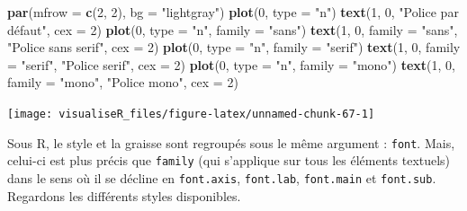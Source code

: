 \documentclass[]{article}
\newenvironment{Shaded}{\begin{snugshade}}{\end{snugshade}}
\newcommand{\DataTypeTok}[1]{\textcolor[rgb]{0.13,0.29,0.53}{#1}}
\newcommand{\DecValTok}[1]{\textcolor[rgb]{0.00,0.00,0.81}{#1}}
\newcommand{\KeywordTok}[1]{\textcolor[rgb]{0.13,0.29,0.53}{\textbf{#1}}}
\newcommand{\NormalTok}[1]{#1}
\newcommand{\StringTok}[1]{\textcolor[rgb]{0.31,0.60,0.02}{#1}}
\begin{document}
\begin{Shaded}
\begin{Highlighting}[]
\KeywordTok{par}\NormalTok{(}\DataTypeTok{mfrow =} \KeywordTok{c}\NormalTok{(}\DecValTok{2}\NormalTok{, }\DecValTok{2}\NormalTok{), }\DataTypeTok{bg =} \StringTok{"lightgray"}\NormalTok{)}
\KeywordTok{plot}\NormalTok{(}\DecValTok{0}\NormalTok{, }\DataTypeTok{type =} \StringTok{"n"}\NormalTok{)}
\KeywordTok{text}\NormalTok{(}\DecValTok{1}\NormalTok{, }\DecValTok{0}\NormalTok{, }\StringTok{"Police par défaut"}\NormalTok{, }\DataTypeTok{cex =} \DecValTok{2}\NormalTok{)}
\KeywordTok{plot}\NormalTok{(}\DecValTok{0}\NormalTok{, }\DataTypeTok{type =} \StringTok{"n"}\NormalTok{, }\DataTypeTok{family =} \StringTok{"sans"}\NormalTok{)}
\KeywordTok{text}\NormalTok{(}\DecValTok{1}\NormalTok{, }\DecValTok{0}\NormalTok{, }\DataTypeTok{family =} \StringTok{"sans"}\NormalTok{, }\StringTok{"Police sans serif"}\NormalTok{, }\DataTypeTok{cex =} \DecValTok{2}\NormalTok{)}
\KeywordTok{plot}\NormalTok{(}\DecValTok{0}\NormalTok{, }\DataTypeTok{type =} \StringTok{"n"}\NormalTok{, }\DataTypeTok{family =} \StringTok{"serif"}\NormalTok{)}
\KeywordTok{text}\NormalTok{(}\DecValTok{1}\NormalTok{, }\DecValTok{0}\NormalTok{, }\DataTypeTok{family =} \StringTok{"serif"}\NormalTok{, }\StringTok{"Police serif"}\NormalTok{, }\DataTypeTok{cex =} \DecValTok{2}\NormalTok{)}
\KeywordTok{plot}\NormalTok{(}\DecValTok{0}\NormalTok{, }\DataTypeTok{type =} \StringTok{"n"}\NormalTok{, }\DataTypeTok{family =} \StringTok{"mono"}\NormalTok{)}
\KeywordTok{text}\NormalTok{(}\DecValTok{1}\NormalTok{, }\DecValTok{0}\NormalTok{, }\DataTypeTok{family =} \StringTok{"mono"}\NormalTok{, }\StringTok{"Police mono"}\NormalTok{, }\DataTypeTok{cex =} \DecValTok{2}\NormalTok{)}
\end{Highlighting}
\end{Shaded}

\begin{center}\texttt{[image: visualiseR\_files/figure-latex/unnamed-chunk-67-1]} \end{center}

Sous R, le style et la graisse sont regroupés sous le même argument : \texttt{font}. Mais, celui-ci est plus précis que \texttt{family} (qui s'applique sur tous les éléments textuels) dans le sens où il se décline en \texttt{font.axis}, \texttt{font.lab}, \texttt{font.main} et \texttt{font.sub}. Regardons les différents styles disponibles.
\end{document}
